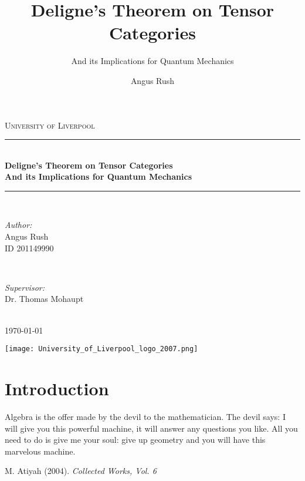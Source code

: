 \documentclass[a4paper,10pt]{scrreprt}
\title{Deligne's Theorem on Tensor Categories}
\subtitle{And its Implications for Quantum Mechanics}
\author{Angus Rush}
\theoremstyle{definition}
\theoremstyle{plain}
\theoremstyle{remark}
\begin{document}
 
\begin{titlepage}
  \newcommand{\HRule}{\rule{\linewidth}{0.5mm}} 

  \center 
  \vspace*{\fill}

  \textsc{\LARGE University of Liverpool}\\[1.5cm] 

  \HRule \\[0.4cm]
  { \huge \bfseries Deligne's Theorem on Tensor Categories}\\[0.4cm] 
  { \Large \bfseries And its Implications for Quantum Mechanics}\\[0.4cm] 
  \HRule \\[1.5cm]

  \begin{minipage}{0.4\textwidth}
    \begin{flushleft} \large
      \emph{Author:}\\
      Angus Rush \\
      ID 201149990
    \end{flushleft}
  \end{minipage}
  ~
  \begin{minipage}{0.4\textwidth}
    \begin{flushright} \large
      \emph{Supervisor:} \\
      Dr. Thomas Mohaupt
    \end{flushright}
  \end{minipage}\\[2cm]

  {\large \today}\\[2cm] 

  \vspace{10em}

  \texttt{[image: University\_of\_Liverpool\_logo\_2007.png]}\\[1cm] 


\end{titlepage}
\tableofcontents 

\chapter{Introduction}
\epigraph{Algebra is the offer made by the devil to the mathematician. The devil says: I will give you this powerful machine, it will answer any questions you like. All you need to do is give me your soul: give up geometry and you will have this marvelous machine.}{M. Atiyah (2004).  \textit{Collected Works, Vol. 6}}
\end{document}
